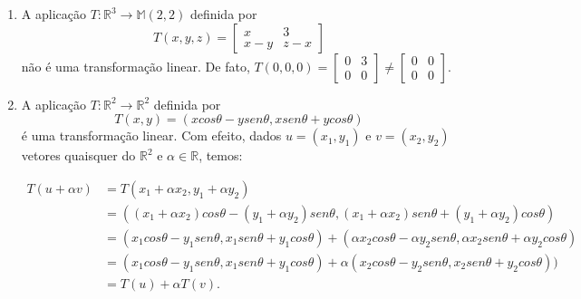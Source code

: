 \begin{enumerate}
\item  A aplicação $T: \mathbb{R}^3 \rightarrow \mathbb{M}(2, 2)$ definida por $$T(x,y, z)= \left[ \begin{array}{cc} x & 3\\ x-y & z-x \end{array} \right]$$  não  é uma transformação linear. De fato, $T(0,0, 0)= \left[ \begin{array}{cc} 0 & 3\\ 0 & 0 \end{array} \right] \neq \left[ \begin{array}{cc} 0 & 0\\ 0 & 0 \end{array} \right]$.

\item  A aplicação $T: \mathbb{R}^2 \rightarrow \mathbb{R}^2$ definida por $$T(x,y)=(xcos\theta - ysen\theta,xsen\theta+ ycos\theta)$$
é uma transformação linear. Com efeito, dados  $u=(x_1,y_1)$ e $v=(x_2,y_2)$ vetores quaisquer do $\mathbb{R}^2$ e $\alpha \in \mathbb{R}$, temos:

\begin{align*}
T(u+\alpha v) &= T(x_1+\alpha x_2, y_1+\alpha y_2) \\
                        &= ((x_1+\alpha x_2)cos\theta - (y_1+\alpha y_2)sen\theta, (x_1+\alpha x_2)sen\theta+ (y_1+\alpha y_2)cos\theta)\\
                       &=  (x_1cos\theta - y_1sen\theta, x_1sen\theta+ y_1cos\theta)+(\alpha x_2cos\theta - \alpha y_2sen\theta, \alpha x_2sen\theta+ \alpha y_2cos\theta)\\
                      &=  (x_1cos\theta - y_1sen\theta, x_1sen\theta+ y_1cos\theta)+\alpha( x_2cos\theta -  y_2sen\theta,  x_2sen\theta+ y_2cos\theta))\\
                       &=T(u)+\alpha T(v).
\end{align*}



\end{enumerate}
